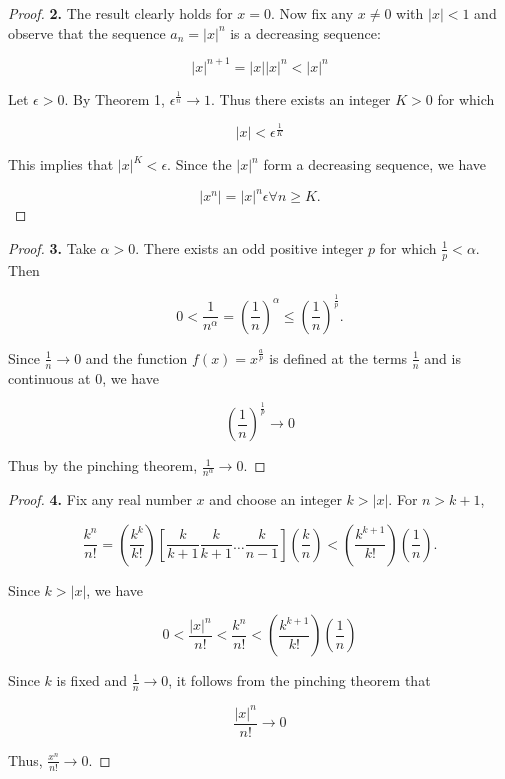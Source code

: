        \begin{proof}
            \textbf{2.} The result clearly holds for $x = 0$. Now fix any $x\not = 0$ with $|x| < 1$ and observe that the sequence $a_n = |x|^n$ is a decreasing sequence:

            \[
                |x|^{n+1} = |x| |x|^n < |x|^n
            \]

            Let $\epsilon > 0$. By Theorem 1, $\epsilon^{\frac{1}{n}}\to 1$. Thus there exists an integer $K>0$ for which

            \[
                |x| < \epsilon^{\frac{1}{K}}
            \]

            This implies that $|x|^K < \epsilon$. Since the $|x|^n$ form a decreasing sequence, we have

            \[
                |x^n| = |x|^n \epsilon \forall n \geq K.
            \]
        \end{proof}

        \begin{proof}
            \textbf{3.} Take $\alpha > 0$. There exists an odd positive integer $p$ for which $\frac{1}{p} < \alpha$. Then

            \[
                0 < \frac{1}{n^{\alpha}} = \left(\frac{1}{n}\right)^{\alpha} \leq \left(\frac{1}{n}\right)^{\frac{1}{p}}.
            \]

            Since $\frac{1}{n}\to 0$ and the function $f(x) = x^{\frac{a}{p}}$ is defined at the terms $\frac{1}{n}$ and is continuous at 0, we have

            \[
                \left(\frac{1}{n}\right)^{\frac{1}{p}} \to 0
            \]

            Thus by the pinching theorem, $\frac{1}{n^{\alpha}}\to 0$.
        \end{proof}

        \begin{proof}
            \textbf{4.} Fix any real number $x$ and choose an integer $k > |x|$. For $n > k+1$,

            \[
                \frac{k^n}{n!} = \left(\frac{k^k}{k!}\right)\left[\frac{k}{k+1}\frac{k}{k+1}\dots\frac{k}{n-1}\right]\left(\frac{k}{n}\right) < \left(\frac{k^{k+1}}{k!}\right) \left(\frac{1}{n}\right)
.           \]

            Since $k > |x|$, we have

            \[
                0 < \frac{|x|^n}{n!} < \frac{k^n}{n!} < \left(\frac{k^{k+1}}{k!}\right) \left(\frac{1}{n}\right)
            \]

            Since $k$ is fixed and $\frac{1}{n}\to 0$, it follows from the pinching theorem that

            \[
                \frac{|x|^n}{n!}\to 0
            \]

            Thus, $\frac{x^n}{n!}\to 0$.
        \end{proof}

